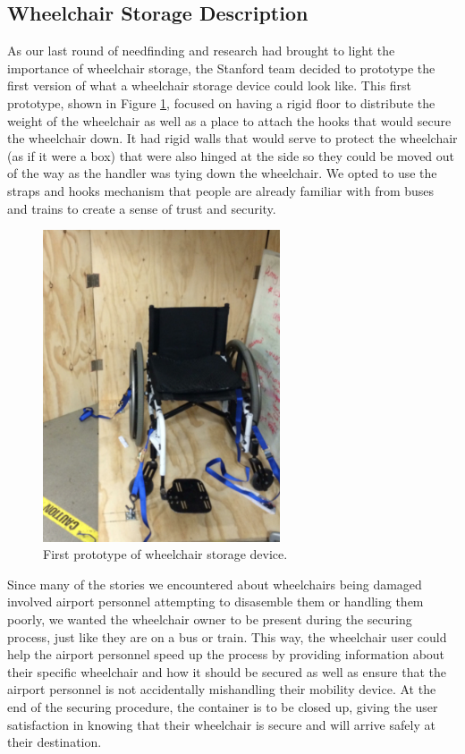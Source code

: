\subsection{Wheelchair Storage Description}

As our last round of needfinding and research had brought to light the importance of wheelchair storage, the Stanford team decided to prototype the first version of what a wheelchair storage device could look like. This first prototype, shown in 
Figure \ref{fig:wheelchairprototype1.png}, focused on having a rigid floor to distribute the weight of the wheelchair as well as a place to attach the hooks that would secure the wheelchair down. It had rigid walls that would serve to protect the wheelchair (as if it were a box) that were also hinged at the side so they could be moved out of the way as the handler was tying down the wheelchair. We opted to use the straps and hooks mechanism that people are already familiar with from buses and trains to create a sense of trust and security. 

\begin{figure}[h]
  \centering
     \includegraphics[width=7cm]{images/wheelchairprototype1.png}
   \caption{First prototype of wheelchair storage device.}
  \label{fig:wheelchairprototype1.png}
\end{figure}

Since many of the stories we encountered about wheelchairs being damaged involved airport personnel attempting to disasemble them or handling them poorly, we wanted the wheelchair owner to be present during the securing process, just like they are on a bus or train. This way, the wheelchair user could help the airport personnel speed up the process by providing information about their specific wheelchair and how it should be secured as well as ensure that the airport personnel is not accidentally mishandling their mobility device. At the end of the securing procedure, the container is to be closed up, giving the user satisfaction in knowing that their wheelchair is secure and will arrive safely at their destination. 
 
